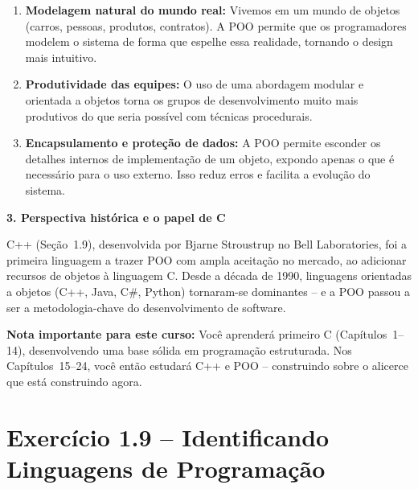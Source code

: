 \documentclass[12pt,a4paper]{article}
\begin{document}
\begin{respostabox}
\begin{enumerate}
  \item \textbf{Modelagem natural do mundo real:} Vivemos em um mundo de objetos (carros,
  pessoas, produtos, contratos). A POO permite que os programadores modelem o sistema de
  forma que espelhe essa realidade, tornando o design mais intuitivo.

  \item \textbf{Produtividade das equipes:} O uso de uma abordagem modular e orientada
  a objetos torna os grupos de desenvolvimento muito mais produtivos do que seria possível
  com técnicas procedurais.

  \item \textbf{Encapsulamento e proteção de dados:} A POO permite esconder os detalhes
  internos de implementação de um objeto, expondo apenas o que é necessário para o uso
  externo. Isso reduz erros e facilita a evolução do sistema.
\end{enumerate}

\bigskip
\textbf{3. Perspectiva histórica e o papel de C}

C++ (Seção~1.9), desenvolvida por Bjarne Stroustrup no Bell Laboratories, foi a primeira
linguagem a trazer POO com ampla aceitação no mercado, ao adicionar recursos de objetos
à linguagem C. Desde a década de 1990, linguagens orientadas a objetos (C++, Java, C\#,
Python) tornaram-se dominantes -- e a POO passou a ser a metodologia-chave do
desenvolvimento de software.

\medskip
\textbf{Nota importante para este curso:} Você aprenderá primeiro C (Capítulos~1--14),
desenvolvendo uma base sólida em programação estruturada. Nos Capítulos~15--24, você
então estudará C++ e POO -- construindo sobre o alicerce que está construindo agora.

\end{respostabox}

\newpage

\section{Exercício 1.9 -- Identificando Linguagens de Programação}
\end{document}
